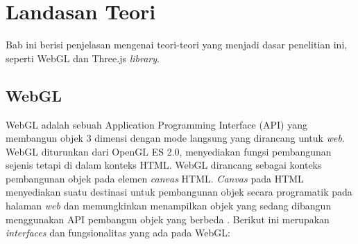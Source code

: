 \chapter{Landasan Teori}
\label{chap:teori}
Bab ini berisi penjelasan mengenai teori-teori yang menjadi dasar penelitian ini, seperti WebGL dan Three.js \textit{library}.

\section{WebGL}
\label{sec:webgl} 
WebGL adalah sebuah Application Programming Interface (API) yang membangun objek 3 dimensi dengan mode langsung yang dirancang untuk {\it web}. WebGL diturunkan dari OpenGL ES 2.0, menyediakan fungsi pembangunan sejenis tetapi di dalam konteks HTML. WebGL dirancang sebagai konteks pembangunan objek pada elemen {\it canvas} HTML. {\it Canvas} pada HTML menyediakan suatu destinasi untuk pembangunan objek secara programatik pada halaman {\it web} dan memungkinkan menampilkan objek yang sedang dibangun menggunakan API pembangun objek yang berbeda \cite{webgl}. Berikut ini merupakan {\it interfaces} dan fungsionalitas yang ada pada WebGL:

